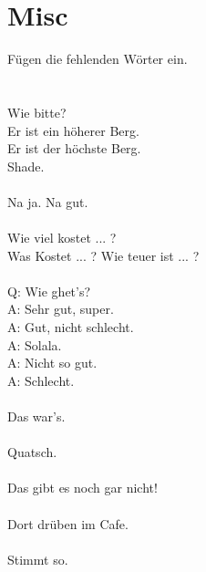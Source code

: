 \section{Misc}
Fügen die fehlenden Wörter ein.  \\
\\
\\
Wie bitte?  \\Er ist ein höherer Berg. \\
Er ist der höchste Berg.
\\
Shade.  \\
\\
Na ja. Na gut.  \\
\\
Wie viel kostet ... ?  \\
Was Kostet ... ?
Wie teuer ist ... ? \\
\\
Q: Wie ghet's? \\
A: Sehr gut, super. \\
A: Gut, nicht schlecht. \\
A: Solala. \\
A: Nicht so gut. \\
A: Schlecht. \\
\\
Das war's.  \\
\\
Quatsch.  \\
\\
Das gibt es noch gar nicht!  \\
\\
Dort drüben im Cafe.  \\
\\
Stimmt so. 

\restoregeometry